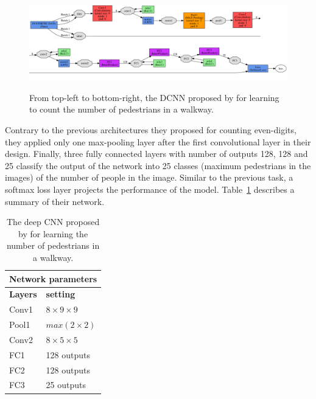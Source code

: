 \begin{figure}[H]
  \centering
   {\includegraphics[width=1.00\textwidth]{images/santiucsd}}
	\caption{From top-left to bottom-right, the DCNN proposed by \cite{segui2015learning} for learning to count the number of pedestrians in a walkway.}
	\label{santiucsdnet}
\end{figure}

Contrary to the previous architectures they proposed for counting even-digits, they applied only one max-pooling layer after the first convolutional layer in their design. Finally, three fully connected layers with number of outputs 128, 128 and 25 classify the output of the network into 25 classes (maximum pedestrians in the images) of the number of people in the image. Similar to the previous task, a softmax loss layer projects the performance of the model.   
Table~\ref{santiarch} describes a summary of their network.

\begin{table}[H]
	\centering
	\begin{tabular}{ |p{2cm}|p{2cm}| }
	\hline 
	\multicolumn{2}{|c|}{\textbf{Network parameters}} \\
	\hline
	\hline
	\textbf{Layers} & \textbf{setting }\\
	\hline
	Conv1 & $8\times9\times9$\\
	\hline
	Pool1    & $max(2\times2)$ \\
	\hline
	Conv2 & $8\times5\times5$\\
	\hline
	FC1 & 128 outputs \\
	\hline
	FC2 & 128 outputs \\
	\hline
	FC3 & 25 outputs \\
	\hline
	\end{tabular}
		\caption{The deep CNN proposed by \citealt{segui2015learning} for learning the number of pedestrians in a walkway.}
		\label{santiarch}
\end{table}


